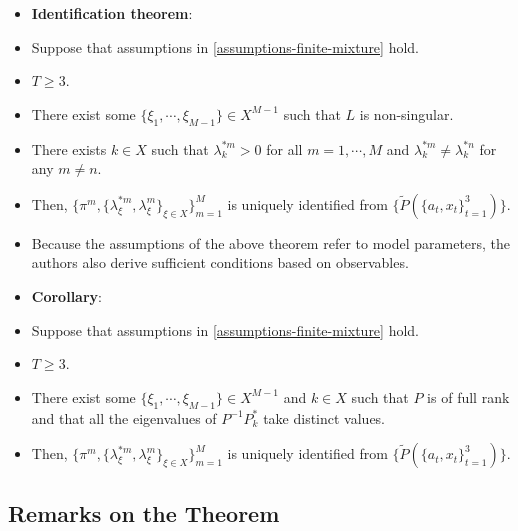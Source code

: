 \documentclass[
]{book}
\providecommand{\tightlist}{%
  \setlength{\itemsep}{0pt}\setlength{\parskip}{0pt}}
\begin{document}
\begin{itemize}
\tightlist
\item
  \textbf{Identification theorem}:
\item
  Suppose that assumptions in \ref{assumptions-finite-mixture} hold.
\item
  \(T \ge 3\).
\item
  There exist some \(\{\xi_1, \cdots, \xi_{M - 1}\} \in X^{M - 1}\) such that \(L\) is non-singular.
\item
  There exists \(k \in X\) such that \(\lambda_k^{*m} > 0\) for all \(m = 1, \cdots, M\) and \(\lambda_k^{*m} \neq \lambda_k^{*n}\) for any \(m \neq n\).
\item
  Then, \(\{\pi^m, \{\lambda_\xi^{*m}, \lambda_\xi^m\}_{\xi \in X}\}_{m = 1}^M\) is uniquely identified from \(\{\widetilde{P}(\{a_t, x_t\}_{t = 1}^3)\}\).
\item
  Because the assumptions of the above theorem refer to model parameters, the authors also derive sufficient conditions based on observables.
\item
  \textbf{Corollary}:
\item
  Suppose that assumptions in \ref{assumptions-finite-mixture} hold.
\item
  \(T \ge 3\).
\item
  There exist some \(\{\xi_1, \cdots, \xi_{M - 1}\} \in X^{M - 1}\) and \(k \in X\) such that \(P\) is of full rank and that all the eigenvalues of \(P^{-1}P_k^*\) take distinct values.
\item
  Then, \(\{\pi^m, \{\lambda_\xi^{*m}, \lambda_\xi^m\}_{\xi \in X}\}_{m = 1}^M\) is uniquely identified from \(\{\widetilde{P}(\{a_t, x_t\}_{t = 1}^3)\}\).
\end{itemize}

\hypertarget{remarks-on-the-theorem}{%
\subsection{Remarks on the Theorem}\label{remarks-on-the-theorem}}
\end{document}
